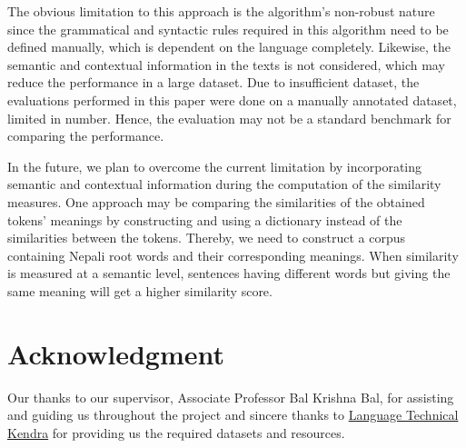 \documentclass[conference]{IEEEtran}
\begin{document}
The obvious limitation to this approach is the algorithm's non-robust nature 
since the grammatical and syntactic rules required in this algorithm need to be
defined manually, which is dependent on the language completely. Likewise, the
semantic and contextual information in the texts is not considered, which may reduce the performance in a large dataset. Due
to insufficient dataset, the evaluations performed in this paper were done on a
manually annotated dataset, limited in number. Hence, the evaluation may not be a
standard benchmark for comparing the performance.

In the future, we plan to overcome the current limitation by incorporating semantic
and contextual information during the computation of the similarity measures.
One approach may be comparing the similarities of the obtained
tokens' meanings by constructing and using a dictionary instead of the similarities
between the tokens. Thereby, we need to construct a corpus containing Nepali
root words and their corresponding meanings. When similarity is measured at a
semantic level, sentences having different words but giving the same meaning
will get a higher similarity score.

\section*{Acknowledgment}
Our thanks to our supervisor, Associate Professor Bal Krishna Bal,
for assisting and guiding us throughout the project and sincere thanks to 
\href{http://ltk.org.np/}{Language Technical Kendra} for providing us the
required datasets and resources.

 

\end{document}
